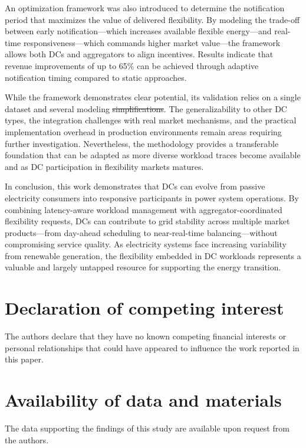 \documentclass[preprint,12pt]{elsarticle}
\makeatletter
\providecommand{\DIFaddtex}[1]{{\protect\color{blue}\uwave{#1}}} %
\providecommand{\DIFdeltex}[1]{{\protect\color{red}\sout{#1}}} %
\providecommand{\DIFaddbegin}{} %
\providecommand{\DIFaddend}{} %
\providecommand{\DIFdelbegin}{} %
\providecommand{\DIFdelend}{} %
\providecommand{\DIFadd}[1]{\texorpdfstring{\DIFaddtex{#1}}{#1}} %
\providecommand{\DIFdel}[1]{\texorpdfstring{\DIFdeltex{#1}}{}} %
\providecommand{\DIFscaledelfig}{0.5}
\newlength{\DIFdelgraphicswidth} %
\newlength{\DIFdelgraphicsheight} %
\providecommand{\DIFaddincludegraphics}[2][]{{\color{blue}\fbox{\DIFOincludegraphics[#1]{#2}}}} %
\providecommand{\DIFdelincludegraphics}[2][]{%
\sbox{\DIFdelgraphicsbox}{\DIFOincludegraphics[#1]{#2}}%
\settoboxwidth{\DIFdelgraphicswidth}{\DIFdelgraphicsbox} %
\settoboxtotalheight{\DIFdelgraphicsheight}{\DIFdelgraphicsbox} %
\scalebox{\DIFscaledelfig}{%
\parbox[b]{\DIFdelgraphicswidth}{\usebox{\DIFdelgraphicsbox}\\[-\baselineskip] \rule{\DIFdelgraphicswidth}{0em}}\llap{\resizebox{\DIFdelgraphicswidth}{\DIFdelgraphicsheight}{%
\setlength{\unitlength}{\DIFdelgraphicswidth}%
\begin{picture}(1,1)%
\thicklines\linethickness{2pt} %
{\color[rgb]{1,0,0}\put(0,0){\framebox(1,1){}}}%
{\color[rgb]{1,0,0}\put(0,0){\line( 1,1){1}}}%
{\color[rgb]{1,0,0}\put(0,1){\line(1,-1){1}}}%
\end{picture}%
}\hspace*{3pt}}} %
} %
\DeclareRobustCommand{\DIFaddbegin}{\DIFOaddbegin \let\includegraphics\DIFaddincludegraphics} %
\DeclareRobustCommand{\DIFaddend}{\DIFOaddend \let\includegraphics\DIFOincludegraphics} %
\DeclareRobustCommand{\DIFdelbegin}{\DIFOdelbegin \let\includegraphics\DIFdelincludegraphics} %
\DeclareRobustCommand{\DIFdelend}{\DIFOaddend \let\includegraphics\DIFOincludegraphics} %
\let\sout@orig\sout %
\renewcommand{\sout}[1]{\ifmmode\text{\sout@orig{\ensuremath{#1}}}\else\sout@orig{#1}\fi} %
\makeatother
\begin{document}
An optimization framework was also introduced to determine the notification period that maximizes the value of delivered flexibility. By modeling the trade-off between early notification—which increases available flexible energy—and real-time responsiveness—which commands higher market value—the framework allows both DCs and aggregators to align incentives. Results indicate that revenue improvements of up to 65\% can be achieved through adaptive notification timing compared to static approaches.

While the framework demonstrates clear potential, its validation relies on a single dataset and several modeling \DIFdelbegin \DIFdel{simplifications}\DIFdelend \DIFaddbegin \DIFadd{assumptions}\DIFaddend . The generalizability to other DC types, the integration challenges with real market mechanisms, and the practical implementation overhead in production environments remain areas requiring further investigation. Nevertheless, the methodology provides a transferable foundation that can be adapted as more diverse workload traces become available and as DC participation in flexibility markets matures.

In conclusion, this work demonstrates that DCs can evolve from passive electricity consumers into responsive participants in power system operations. By combining latency-aware workload management with aggregator-coordinated flexibility requests, DCs can contribute to grid stability across multiple market products—from day-ahead scheduling to near-real-time balancing—without compromising service quality. As electricity systems face increasing variability from renewable generation, the flexibility embedded in DC workloads represents a valuable and largely untapped resource for supporting the energy transition.


\section*{Declaration of competing interest}
The authors declare that they have no known competing financial interests or personal relationships that could have appeared to influence the work reported in this paper.

\section*{Availability of data and materials}
The data supporting the findings of this study are available upon request from the authors.
\end{document}
